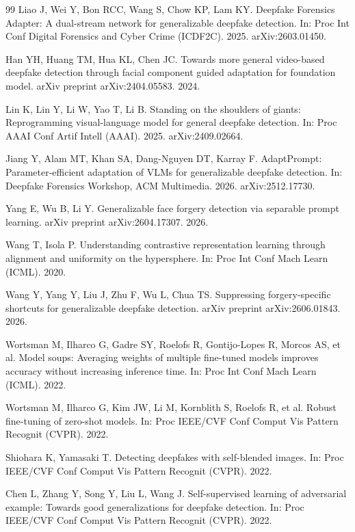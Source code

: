 \documentclass[fonts]{icst}
\begin{document}
\begin{thebibliography}{99}
Liao J, Wei Y, Bon RCC, Wang S, Chow KP, Lam KY.
Deepfake Forensics Adapter: A dual-stream network for generalizable deepfake detection.
In: Proc Int Conf Digital Forensics and Cyber Crime (ICDF2C). 2025. arXiv:2603.01450.

Han YH, Huang TM, Hua KL, Chen JC.
Towards more general video-based deepfake detection through facial component guided adaptation for foundation model.
arXiv preprint arXiv:2404.05583. 2024.

Lin K, Lin Y, Li W, Yao T, Li B.
Standing on the shoulders of giants: Reprogramming visual-language model for general deepfake detection.
In: Proc AAAI Conf Artif Intell (AAAI). 2025. arXiv:2409.02664.

Jiang Y, Alam MT, Khan SA, Dang-Nguyen DT, Karray F.
AdaptPrompt: Parameter-efficient adaptation of VLMs for generalizable deepfake detection.
In: Deepfake Forensics Workshop, ACM Multimedia. 2026. arXiv:2512.17730.

Yang E, Wu B, Li Y.
Generalizable face forgery detection via separable prompt learning.
arXiv preprint arXiv:2604.17307. 2026.

Wang T, Isola P.
Understanding contrastive representation learning through alignment and uniformity on the hypersphere.
In: Proc Int Conf Mach Learn (ICML). 2020.

Wang Y, Yang Y, Liu J, Zhu F, Wu L, Chua TS.
Suppressing forgery-specific shortcuts for generalizable deepfake detection.
arXiv preprint arXiv:2606.01843. 2026.

Wortsman M, Ilharco G, Gadre SY, Roelofs R, Gontijo-Lopes R, Morcos AS, et al.
Model soups: Averaging weights of multiple fine-tuned models improves accuracy without increasing inference time.
In: Proc Int Conf Mach Learn (ICML). 2022.

Wortsman M, Ilharco G, Kim JW, Li M, Kornblith S, Roelofs R, et al.
Robust fine-tuning of zero-shot models.
In: Proc IEEE/CVF Conf Comput Vis Pattern Recognit (CVPR). 2022.

Shiohara K, Yamasaki T.
Detecting deepfakes with self-blended images.
In: Proc IEEE/CVF Conf Comput Vis Pattern Recognit (CVPR). 2022.

Chen L, Zhang Y, Song Y, Liu L, Wang J.
Self-supervised learning of adversarial example: Towards good generalizations for deepfake detection.
In: Proc IEEE/CVF Conf Comput Vis Pattern Recognit (CVPR). 2022.


\end{thebibliography}
\end{document}
